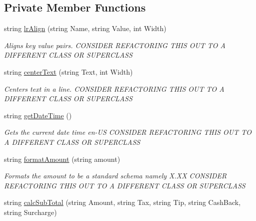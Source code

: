 \subsection*{Private Member Functions}
\begin{DoxyCompactItemize}
\item 
string \mbox{\hyperlink{class_cert_complete_1_1_innowi_device_ae438dadbc675ddfb9a8bbf48c0a143f7}{lr\+Align}} (string Name, string Value, int Width)
\begin{DoxyCompactList}\small\item\em Aligns key value pairs. C\+O\+N\+S\+I\+D\+ER R\+E\+F\+A\+C\+T\+O\+R\+I\+NG T\+H\+IS O\+UT TO A D\+I\+F\+F\+E\+R\+E\+NT C\+L\+A\+SS OR S\+U\+P\+E\+R\+C\+L\+A\+SS \end{DoxyCompactList}\item 
string \mbox{\hyperlink{class_cert_complete_1_1_innowi_device_a12ea6f76bf368eba8130b0e8d2a7a09a}{center\+Text}} (string Text, int Width)
\begin{DoxyCompactList}\small\item\em Centers text in a line. C\+O\+N\+S\+I\+D\+ER R\+E\+F\+A\+C\+T\+O\+R\+I\+NG T\+H\+IS O\+UT TO A D\+I\+F\+F\+E\+R\+E\+NT C\+L\+A\+SS OR S\+U\+P\+E\+R\+C\+L\+A\+SS \end{DoxyCompactList}\item 
string \mbox{\hyperlink{class_cert_complete_1_1_innowi_device_af454a3482e7fa81495f3ea39a1e490ce}{get\+Date\+Time}} ()
\begin{DoxyCompactList}\small\item\em Gets the current date time en-\/\+US C\+O\+N\+S\+I\+D\+ER R\+E\+F\+A\+C\+T\+O\+R\+I\+NG T\+H\+IS O\+UT TO A D\+I\+F\+F\+E\+R\+E\+NT C\+L\+A\+SS OR S\+U\+P\+E\+R\+C\+L\+A\+SS \end{DoxyCompactList}\item 
string \mbox{\hyperlink{class_cert_complete_1_1_innowi_device_afc4016ed76d1ab4ab3d8365c23800d64}{format\+Amount}} (string amount)
\begin{DoxyCompactList}\small\item\em Formats the amount to be a standard schema namely X.\+XX C\+O\+N\+S\+I\+D\+ER R\+E\+F\+A\+C\+T\+O\+R\+I\+NG T\+H\+IS O\+UT TO A D\+I\+F\+F\+E\+R\+E\+NT C\+L\+A\+SS OR S\+U\+P\+E\+R\+C\+L\+A\+SS \end{DoxyCompactList}\item 
string \mbox{\hyperlink{class_cert_complete_1_1_innowi_device_a6be1ef3889195a5b3d3b81306c77608b}{calc\+Sub\+Total}} (string Amount, string Tax, string Tip, string Cash\+Back, string Surcharge)

\end{DoxyCompactItemize}
